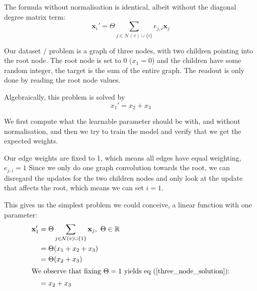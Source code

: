 \documentclass[a4paper,12pt]{article}
\begin{document}
The formula without normalisation is identical, albeit without the diagonal degree matrix term:
\begin{equation}
  \mathbf{x}_i' = \Theta \sum_{j \in \mathcal{N}(v) \cup \{i\}} e_{j,i} \mathbf{x}_j
\end{equation}

Our dataset / problem is a graph of three nodes, with two children pointing into the root node. The root node is set to 0 (\(x_{1}=0\)) and the children have some random integer, the target is the sum of the entire graph. The readout is only done by reading the root node values.
\begin{figure}[H]
  \centering
{}
\end{figure}
Algebraically, this problem is solved by
\begin{equation}
x_{1}' = x_{2}+x_{3} \label{three_node_solution}
\end{equation}


We first compute what the learnable parameter should be with, and without normalisation, and then we try to train the model and verify that we get the expected weights.

Our edge weights are fixed to 1, which means all edges have equal weighting, \(e_{j, i}=1\) Since we only do one graph convolution towards the root, we can disregard the updates for the two children nodes and only look at the update that affects the root, which means we can set \(i=1\).

This gives us the simplest problem we could conceive, a linear function with one parameter:
\begin{align}
  \mathbf{x}_1' &= \Theta \sum_{j \in \mathcal{N}(v) \cup \{1\}} \mathbf{x}_j,\ \Theta \in \mathbb{R}\\
   &= \Theta (x_{1} + x_{2} + x_{3})\\
                &= \Theta (x_{2} + x_{3})\\
  \intertext{We observe that fixing \(\Theta=1\) yields eq (\ref{three_node_solution}):}
                  &= x_{2} + x_{3}
\end{align}
\end{document}
